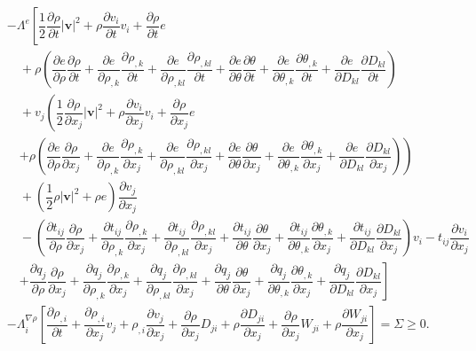 \documentclass[a4paper,fleqn]{cas-sc}
\theoremstyle{definition}
\begin{document}
\begin{align*}
	\\
	&-\Lambda^e\left[\dfrac{1}{2}\dfrac{\partial\rho}{\partial t}|\mathbf{v}|^2+\rho\dfrac{\partial v_i}{\partial t}v_i+\dfrac{\partial\rho}{\partial t} e\right. 
	\\
	& \quad +\rho\left(\dfrac{\partial e}{\partial\rho}\dfrac{\partial\rho}{\partial t}+\dfrac{\partial e}{\partial\rho_{,k}}\dfrac{\partial\rho_{,k}}{\partial t}+\dfrac{\partial e}{\partial\rho_{,kl}}\dfrac{\partial\rho_{,kl}}{\partial t}+\dfrac{\partial e}{\partial\theta}\dfrac{\partial\theta}{\partial t}+\dfrac{\partial e}{\partial\theta_{,k}}\dfrac{\partial\theta_{,k}}{\partial t}+\dfrac{\partial e}{\partial D_{kl}}\dfrac{\partial D_{kl}}{\partial t}\right) 
	\\
	& \quad +v_j\left(\dfrac{1}{2}\dfrac{\partial\rho}{\partial x_j}|\mathbf{v}|^2+\rho\dfrac{\partial v_i}{\partial x_j}v_i+\dfrac{\partial\rho}{\partial x_j} e\right. 
	\\
	& \quad \left.+\rho\left(\dfrac{\partial e}{\partial\rho}\dfrac{\partial\rho}{\partial x_j}+\dfrac{\partial e}{\partial\rho_{,k}}\dfrac{\partial\rho_{,k}}{\partial x_j}+\dfrac{\partial e}{\partial\rho_{,kl}}\dfrac{\partial\rho_{,kl}}{\partial x_j}+\dfrac{\partial e}{\partial\theta}\dfrac{\partial\theta}{\partial x_j}+\dfrac{\partial e}{\partial\theta_{,k}}\dfrac{\partial\theta_{,k}}{\partial x_j}+\dfrac{\partial e}{\partial D_{kl}}\dfrac{\partial D_{kl}}{\partial x_j}\right)\right) 
	\\
	& \quad +\left(\dfrac{1}{2}\rho\vert\mathbf{v}\vert^2+\rho e\right)\dfrac{\partial v_j}{\partial x_j} 
	\\
	& \quad -\left(\dfrac{\partial t_{ij}}{\partial\rho}\dfrac{\partial\rho}{\partial x_j}+\dfrac{\partial t_{ij}}{\partial\rho_{,k}}\dfrac{\partial\rho_{,k}}{\partial x_j}+\dfrac{\partial t_{ij}}{\partial\rho_{,kl}}\dfrac{\partial\rho_{,kl}}{\partial x_j}+\dfrac{\partial t_{ij}}{\partial\theta}\dfrac{\partial\theta}{\partial x_j}+\dfrac{\partial t_{ij}}{\partial\theta_{,k}}\dfrac{\partial\theta_{,k}}{\partial x_j}+\dfrac{\partial t_{ij}}{\partial D_{kl}}\dfrac{\partial D_{kl}}{\partial x_j}\right)v_i-t_{ij}\dfrac{\partial v_i}{\partial x_j} 
	\\
	& \quad \left.+\dfrac{\partial q_j}{\partial\rho}\dfrac{\partial\rho}{\partial x_j}+\dfrac{\partial q_j}{\partial\rho_{,k}}\dfrac{\partial\rho_{,k}}{\partial x_j}+\dfrac{\partial q_j}{\partial\rho_{,kl}}\dfrac{\partial\rho_{,kl}}{\partial x_j}+\dfrac{\partial q_j}{\partial\theta}\dfrac{\partial\theta}{\partial x_j}+\dfrac{\partial q_j}{\partial\theta_{,k}}\dfrac{\partial\theta_{,k}}{\partial x_j}+\dfrac{\partial q_j}{\partial D_{kl}}\dfrac{\partial D_{kl}}{\partial x_j}\right] 
	\\
	&-\Lambda^{\nabla\rho}_i\left[\dfrac{\partial\rho_{,i}}{\partial t}+\dfrac{\partial\rho_{,i}}{\partial x_j}v_j+\rho_{,i}\dfrac{\partial v_j}{\partial x_j}+\dfrac{\partial\rho}{\partial x_j}D_{ji}+\rho\dfrac{\partial D_{ji}}{\partial x_j}+\dfrac{\partial\rho}{\partial x_j}W_{ji}+\rho\dfrac{\partial W_{ji}}{\partial x_j}\right]=\Sigma\geq 0.
\end{align*}
\end{document}
